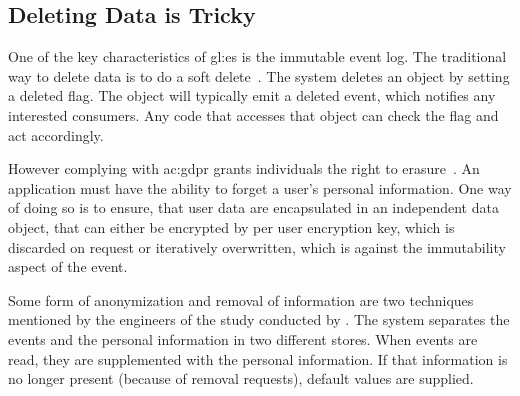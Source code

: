 
\subsection{Deleting Data is Tricky}

One of the key characteristics of \gls{gl:es} is the immutable event log. The traditional way to delete data is to do a soft delete~\citep{richardson2018microservices}. The system deletes an object by setting a deleted flag. The object will typically emit a deleted event, which notifies any interested consumers. Any code that accesses that object can check the flag and act accordingly.

However complying with \gls{ac:gdpr} grants individuals the right to erasure~\citep{Art17GDP3}. An application must have the ability to forget a user’s personal information. One way of doing so is to ensure, that user data are encapsulated in an independent data object, that can either be encrypted by per user encryption key, which is discarded on request or iteratively overwritten, which is against the immutability aspect of the event.

Some form of anonymization and removal of information are two techniques mentioned by the engineers of the study conducted by \citep{OVEREEM2021110970}. The system separates the events and the personal information in two different stores. When events are read, they are supplemented with the personal information. If that information is no longer present (because of removal requests), default values are supplied.

